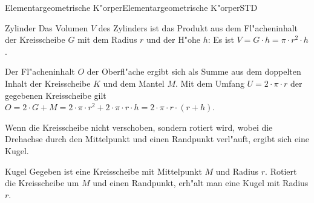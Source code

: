 \begin{MXContent}{Elementargeometrische K"orper}{Elementargeometrische K"orper}{STD}
\begin{MXInfo}{Zylinder}
Das Volumen $V$ des Zylinders ist das Produkt aus dem Fl"acheninhalt der 
Kreisscheibe $G$ mit dem Radius $r$ und der H"ohe $h$: 
Es ist $V = G \cdot h = \pi \cdot r^2 \cdot h$.

Der Fl"acheninhalt $O$ der Oberfl"ache ergibt sich als Summe aus dem doppelten
Inhalt der Kreisscheibe $K$ und dem Mantel $M$.
Mit dem Umfang $U = 2 \cdot \pi \cdot r$ der gegebenen Kreisscheibe
gilt 
$O = 2 \cdot G + M = 2 \cdot \pi \cdot r^2 + 2 \cdot \pi \cdot r \cdot h %
 = 2 \cdot \pi \cdot r \cdot (r + h)$.
\end{MXInfo}

Wenn die Kreisscheibe nicht verschoben, sondern rotiert wird, wobei die 
Drehachse durch den Mittelpunkt und einen Randpunkt verl"auft, ergibt sich
eine Kugel.

\begin{MXInfo}{Kugel}
Gegeben ist eine Kreisscheibe mit Mittelpunkt $M$ und Radius $r$. Rotiert die
Kreisscheibe um $M$ und einen Randpunkt, erh"alt man eine Kugel mit 
Radius $r$.

\begin{center}
\end{center}


\end{MXInfo}
\end{MXContent}
